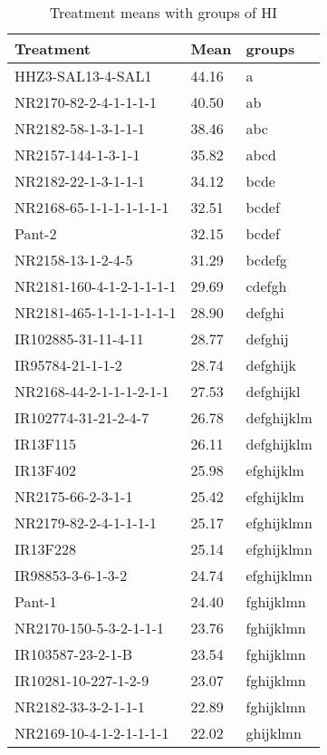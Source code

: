 \documentclass[]{article}
\begin{document}
\begin{longtable}{lll}
\caption{\label{tab:two-fac-groups-tab1}Treatment means with groups of HI}\\
\toprule
Treatment & Mean & groups\\
\midrule
\rowcolor{gray!6}  HHZ3-SAL13-4-SAL1 & 44.16 & a\\
NR2170-82-2-4-1-1-1-1 & 40.50 & ab\\
\rowcolor{gray!6}  NR2182-58-1-3-1-1-1 & 38.46 & abc\\
NR2157-144-1-3-1-1 & 35.82 & abcd\\
\rowcolor{gray!6}  NR2182-22-1-3-1-1-1 & 34.12 & bcde\\
\addlinespace
NR2168-65-1-1-1-1-1-1-1 & 32.51 & bcdef\\
\rowcolor{gray!6}  Pant-2 & 32.15 & bcdef\\
NR2158-13-1-2-4-5 & 31.29 & bcdefg\\
\rowcolor{gray!6}  NR2181-160-4-1-2-1-1-1-1 & 29.69 & cdefgh\\
NR2181-465-1-1-1-1-1-1-1 & 28.90 & defghi\\
\addlinespace
\rowcolor{gray!6}  IR102885-31-11-4-11 & 28.77 & defghij\\
IR95784-21-1-1-2 & 28.74 & defghijk\\
\rowcolor{gray!6}  NR2168-44-2-1-1-1-2-1-1 & 27.53 & defghijkl\\
IR102774-31-21-2-4-7 & 26.78 & defghijklm\\
\rowcolor{gray!6}  IR13F115 & 26.11 & defghijklm\\
\addlinespace
IR13F402 & 25.98 & efghijklm\\
\rowcolor{gray!6}  NR2175-66-2-3-1-1 & 25.42 & efghijklm\\
NR2179-82-2-4-1-1-1-1 & 25.17 & efghijklmn\\
\rowcolor{gray!6}  IR13F228 & 25.14 & efghijklmn\\
IR98853-3-6-1-3-2 & 24.74 & efghijklmn\\
\addlinespace
\rowcolor{gray!6}  Pant-1 & 24.40 & fghijklmn\\
NR2170-150-5-3-2-1-1-1 & 23.76 & fghijklmn\\
\rowcolor{gray!6}  IR103587-23-2-1-B & 23.54 & fghijklmn\\
IR10281-10-227-1-2-9 & 23.07 & fghijklmn\\
\rowcolor{gray!6}  NR2182-33-3-2-1-1-1 & 22.89 & fghijklmn\\
\addlinespace
NR2169-10-4-1-2-1-1-1-1 & 22.02 & ghijklmn\\

\end{longtable}
\end{document}
